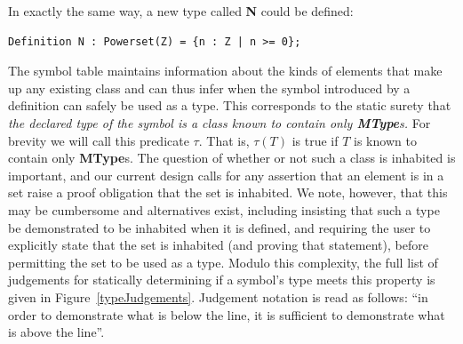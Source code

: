 In exactly the same way, a new type called \textbf{N} could be defined:

\begin{lstlisting}
Definition N : Powerset(Z) = {n : Z | n >= 0};
\end{lstlisting}

The symbol table maintains information about the kinds of elements that make up any existing class and can thus infer when the symbol introduced by a definition can safely be used as a type.  This corresponds to the static surety that \emph{the declared type of the symbol is a class known to contain only \textbf{MType}s.}  For brevity we will call this predicate $\tau$.  That is, $\tau(T)$ is true if $T$ is known to contain only \textbf{MType}s.  The question of whether or not such a class is inhabited is important, and our current design calls for any assertion that an element is in a set raise a proof obligation that the set is inhabited.  We note, however, that this may be cumbersome and alternatives exist, including insisting that such a type be demonstrated to be inhabited when it is defined, and requiring the user to explicitly state that the set is inhabited (and proving that statement), before permitting the set to be used as a type.  Modulo this complexity, the full list of judgements for statically determining if a symbol's type meets this property is given in Figure~\ref{typeJudgements}. Judgement notation is read as follows: ``in order to demonstrate what is below the line, it is sufficient to demonstrate what is above the line''.

